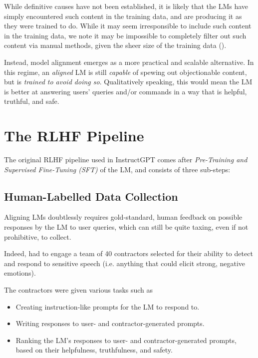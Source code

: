 \documentclass{article} %
\begin{document}
While definitive causes have not been established,
it is likely that the LMs have simply encountered
such content in the training data, and are producing it as
they were trained to do. While it may seem irresponsible to 
include such content in the training data, we note it may be 
impossible to completely filter out such content via manual methods, given the
sheer size of the training data (\cite{Karpathy-2025}).

Instead, model alignment emerges as a more practical and scalable alternative. 
In this regime, an \textit{aligned} LM is still 
\textit{capable} of spewing out objectionable content, 
but is \textit{trained to avoid doing so}. Qualitatively speaking,
this would mean the LM is better at answering users' queries and/or
commands in a way that is helpful, truthful, and safe. 

\section{The RLHF Pipeline}

The original RLHF pipeline used in InstructGPT comes after
\textit{Pre-Training and Supervised Fine-Tuning (SFT)} of the LM,
and consists of three sub-steps:

\subsection{Human-Labelled Data Collection}

Aligning LMs doubtlessly requires gold-standard, human feedback on
possible responses by the LM to user queries, which can still
be quite taxing, even if not prohibitive, to collect.

Indeed, \cite{InstructGPT-2022} had to engage a team of 40 contractors
selected for their ability to detect and respond to sensitive speech
(i.e. anything that could elicit strong, negative emotions).

The contractors were given various tasks such as
\begin{itemize}
    \item Creating instruction-like prompts for the LM to respond to.
    \item Writing responses to user- and contractor-generated prompts.
    \item Ranking the LM's responses to user- and contractor-generated prompts,
        based on their helpfulness, truthfulness, and safety.
\end{itemize}
\end{document}
